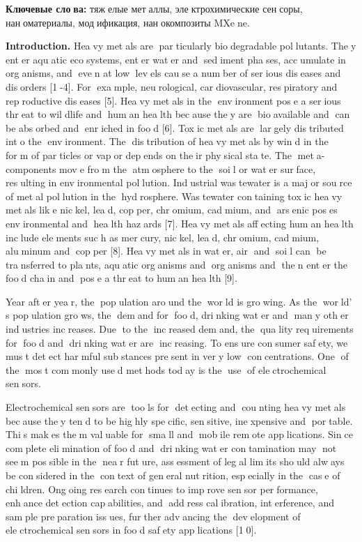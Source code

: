 {{\bfseries Ключевые слова:} тяжелые металлы, электрохимические
сенсоры, наноматериалы, модификация, нанокомпозиты MXene.

{\bfseries Introduction.} Heavy metals are particularly biodegradable
pollutants. They enter aquatic ecosystems, enter water and
sediment phases, accumulate in organisms, and even at low levels
cause a number of serious diseases and disorders {[}1-4{]}. For
example, neurological, cardiovascular, respiratory and
reproductive diseases {[}5{]}. Heavy metals in the environment
pose a serious threat to wildlife and human health because they
are bioavailable and can be absorbed and enriched in food
{[}6{]}. Toxic metals are largely distributed into the
environment. The distribution of heavy metals by wind in the
form of particles or vapor depends on their physical state. The
meta-components move from the atmosphere to the soil or water
surface, resulting in environmental pollution. Industrial
wastewater is a major source of metal pollution in the
hydrosphere. Wastewater containing toxic heavy metals like
nickel, lead, copper, chromium, cadmium, and arsenic poses
environmental and health hazards {[}7{]}. Heavy metals affecting
human health include elements such as mercury, nickel, lead,
chromium, cadmium, aluminum and copper {[}8{]}. Heavy metals in
water, air and soil can be transferred to plants, aquatic
organisms and organisms and then enter the food chain and
pose a threat to human health {[}9{]}.

Year after year, the population around the world is growing. As
the world' s population grows, the demand for
food, drinking water and many other industries increases. Due
to the increased demand, the quality requirements for food and
drinking water are increasing. To ensure consumer safety, we
must detect harmful substances present in very low
concentrations. One of the most commonly used methods today is
the use of electrochemical sensors.

Electrochemical sensors are tools for detecting and counting
heavy metals because they tend to be highly specific, sensitive,
inexpensive and portable. This makes them valuable for small
and mobile remote applications. Since complete elimination of
food and drinking water contamination may not seem possible in
the near future, assessment of legal limits should always be
considered in the context of general nutrition, especially in the
case of children. Ongoing research continues to improve sensor
performance, enhance detection capabilities, and address
calibration, interference, and sample preparation issues, further
advancing the development of electrochemical sensors in food
safety applications {[}10{]}.

}
